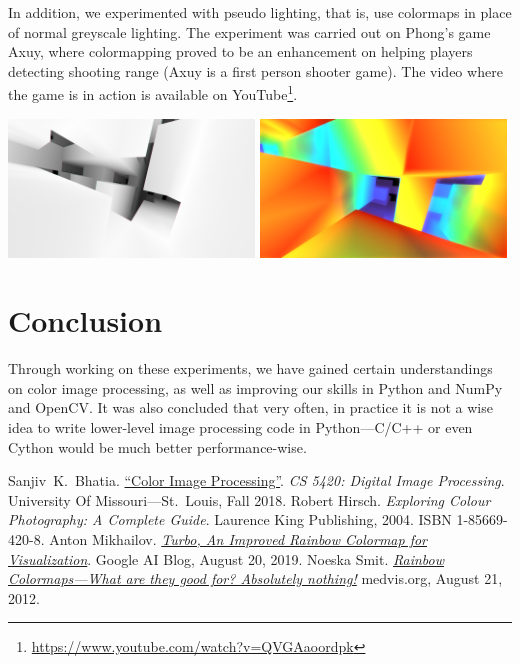 \documentclass[a4paper,12pt]{article}
\begin{document}
In addition, we experimented with pseudo lighting, that is, use colormaps
in place of normal greyscale lighting.  The experiment was carried out on
Phong's game Axuy, where colormapping proved to be an enhancement on helping
players detecting shooting range (Axuy is a first person shooter game).
The video where the game is in action is available on
YouTube\footnote{\url{https://www.youtube.com/watch?v=QVGAaoordpk}}.
\begin{center}
  \includegraphics[width=0.49\textwidth]{axuy-grey.png}
  \includegraphics[width=0.49\textwidth]{axuy-turbo.png}
\end{center}

\section{Conclusion}
Through working on these experiments, we have gained certain understandings on
color image processing, as well as improving our skills in Python and NumPy
and OpenCV.  It was also concluded that very often, in practice it is not a wise
idea to write lower-level image processing code in Python---C/C++ or even Cython
would be much better performance-wise.

\begin{thebibliography}{69}
   Sanjiv~K.~Bhatia.
    \href{http://www.cs.umsl.edu/~sanjiv/classes/cs5420/lectures/color.pdf}
         {``Color Image Processing''}.
    \emph{CS 5420: Digital Image Processing}.
    University Of Missouri---St.~Louis, Fall 2018.
   Robert Hirsch.
    \emph{Exploring Colour Photography: A Complete Guide}.
    Laurence King Publishing, 2004. ISBN 1-85669-420-8.
   Anton Mikhailov.
    \href{https://ai.googleblog.com/2019/08/turbo-improved-rainbow-colormap-for.html}
         {\emph{Turbo, An Improved Rainbow Colormap for Visualization}}.
    Google AI Blog, August 20, 2019.
   Noeska Smit.
    \href{https://medvis.org/2012/08/21/rainbow-colormaps-what-are-they-good-for-absolutely-nothing/}
         {\emph{Rainbow Colormaps---What are they good for? Absolutely nothing!}}
    medvis.org, August 21, 2012.
\end{thebibliography}
\end{document}
